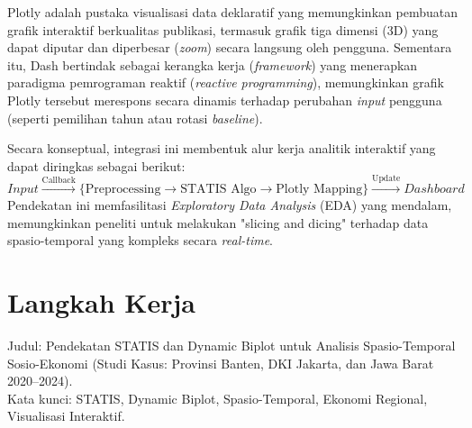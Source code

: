 \documentclass[a4paper]{article}
\theoremstyle{definition} %
\begin{document}
Plotly adalah pustaka visualisasi data deklaratif yang memungkinkan pembuatan grafik interaktif berkualitas publikasi, termasuk grafik tiga dimensi (3D) yang dapat diputar dan diperbesar (\textit{zoom}) secara langsung oleh pengguna. Sementara itu, Dash bertindak sebagai kerangka kerja (\textit{framework}) yang menerapkan paradigma pemrograman reaktif (\textit{reactive programming}), memungkinkan grafik Plotly tersebut merespons secara dinamis terhadap perubahan \textit{input} pengguna (seperti pemilihan tahun atau rotasi \textit{baseline}).

Secara konseptual, integrasi ini membentuk alur kerja analitik interaktif yang dapat diringkas sebagai berikut:
\begin{equation}
    Input \xrightarrow{\text{Callback}} \{ \text{Preprocessing} \to \text{STATIS Algo} \to \text{Plotly Mapping} \} \xrightarrow{\text{Update}} Dashboard
\end{equation}
Pendekatan ini memfasilitasi \textit{Exploratory Data Analysis} (EDA) yang mendalam, memungkinkan peneliti untuk melakukan "slicing and dicing" terhadap data spasio-temporal yang kompleks secara \textit{real-time}.

\newpage
\section{Langkah Kerja}
\bigskip

\noindent
Judul: Pendekatan STATIS dan Dynamic Biplot untuk Analisis Spasio-Temporal Sosio-Ekonomi (Studi Kasus: Provinsi Banten, DKI Jakarta, dan Jawa Barat 2020--2024). \\
Kata kunci: STATIS, Dynamic Biplot, Spasio-Temporal, Ekonomi Regional, Visualisasi Interaktif.

\bigskip
\end{document}
